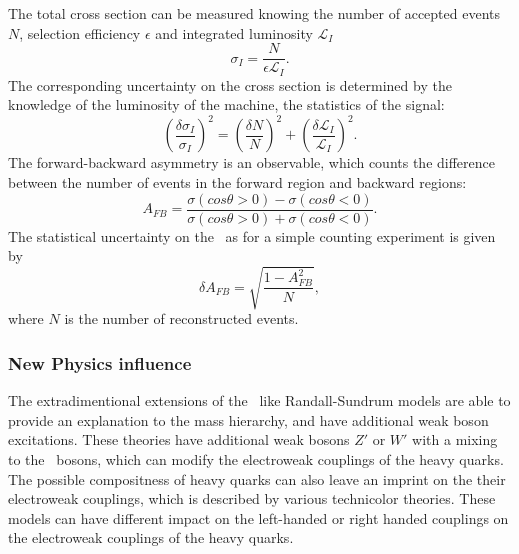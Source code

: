 The total cross section can be measured knowing the number of accepted events $N$, selection efficiency $\epsilon$ and integrated luminosity $\mathcal{L}_I$
\begin{equation}
\sigma_I = \frac{N}{\epsilon \mathcal{L}_I}.
\label{formula:Xsection_3}
\end{equation}
The corresponding uncertainty on the cross section is determined by the knowledge of the luminosity of the machine, the statistics of the signal: 
\begin{equation}
	(\frac{\delta \sigma_I}{\sigma_I})^2 = (\frac{\delta N}{N})^2 + (\frac{\delta \mathcal{L}_I}{\mathcal{L}_I})^2.
\end{equation}
The forward-backward asymmetry is an observable, which counts the difference between the number of events in the forward region and backward regions:
\begin{equation}
A_{FB} = \frac{\sigma(cos\theta > 0) - \sigma(cos\theta < 0)}{\sigma(cos\theta > 0) + \sigma(cos\theta < 0)}.
\end{equation}
The statistical uncertainty on the \afb\ as for a simple counting experiment is given by 
\begin{equation}
\delta A_{FB} = \sqrt{\frac{1-A_{FB}^2}{N}},
\end{equation}
where $N$ is the number of reconstructed events. 

\subsubsection{New Physics influence}

The extradimentional extensions of the \sm\ like Randall-Sundrum models are able to provide an explanation to the mass hierarchy, and have additional weak boson excitations. 
These theories have additional weak bosons $Z'$ or $W'$ with a mixing to the \sm\ bosons, which can modify the electroweak couplings of the heavy quarks. 
The possible compositness of heavy quarks can also leave an imprint on the their electroweak couplings, which is described by various technicolor theories.
These models can have different impact on the left-handed or right handed couplings on the electroweak couplings of the heavy quarks. 

